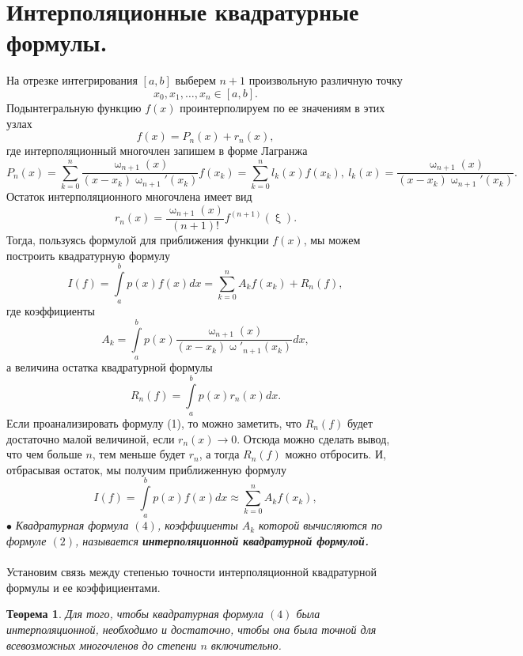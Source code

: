 \documentclass[a4paper, 12pt]{report}
\numberwithin{equation}{section}
\renewcommand{\omega}{\upomega}
\renewcommand{\xi}{\upxi}
\newtheorem*{theorem}{Теорема}
\begin{document}
	 \section{Интерполяционные квадратурные формулы.}
	 На отрезке интегрирования $[a,b]$ выберем $n+1$ произвольную различную точку $$x_0,x_1,\ldots, x_n \in [a,b].$$ Подынтегральную функцию $f(x)$ проинтерполируем по ее значениям в этих узлах $$f(x) = P_n(x) + r_n(x),$$ где интерполяционный многочлен запишем в форме Лагранжа $$P_n(x)=\sum_{k=0}^{n}\dfrac{\omega_{n+1}(x)}{(x-x_k)\omega_{n+1}'(x_k)}f(x_k) = \sum_{k=0}^{n} l_k(x) f(x_k),\ l_k(x) = \dfrac{\omega_{n+1}(x)}{(x-x_k)\omega_{n+1}'(x_k)}.$$  
	 Остаток интерполяционного многочлена имеет вид $$r_n(x) = \dfrac{\omega_{n+1}(x)}{(n+1)!}f^{(n+1)}(\xi).$$
	 Тогда, пользуясь формулой для приближения функции $f(x)$, мы можем построить квадратурную формулу \begin{equation}
	 	I(f) = \int\limits_a^b p(x)f(x)dx = \sum_{k=0}^{n}A_kf(x_k) + R_n(f),
	 \end{equation}
	 где коэффициенты 
	 \begin{equation}
	 	A_k = \int\limits_a^b p(x) \dfrac{\omega_{n+1}(x)}{(x-x_k)\omega'_{n+1}(x_k)}dx,
	 \end{equation}
	 а величина остатка квадратурной формулы 
	 \begin{equation}
	 	R_n(f) = \int\limits_a^b p(x)r_n(x)dx.
	 \end{equation}
	 Если проанализировать формулу (1), то можно заметить, что $R_n(f)$ будет достаточно малой величиной, если $r_n(x) \to 0$. Отсюда можно сделать вывод, что чем больше $n$, тем меньше будет $r_n$, а тогда $R_n(f)$ можно отбросить. И, отбрасывая остаток, мы получим приближенную формулу 
	 \begin{equation}
	 	I(f) = \int\limits_a^b p(x)f(x)dx \approx \sum_{k=0}^{n}A_kf(x_k),
	 \end{equation}
	 $\bullet$ \textit{Квадратурная формула $(4)$, коэффициенты $A_k$ которой вычисляются по формуле $(2)$, называется \textbf{интерполяционной квадратурной формулой.}}\\\\
	 Установим связь между степенью точности интерполяционной квадратурной формулы и ее коэффициентами.
	 \begin{theorem}
	 	Для того, чтобы квадратурная формула $(4)$ была интерполяционной, необходимо и достаточно, чтобы она была точной для всевозможных многочленов до степени $n$ включительно.
	 \end{theorem}
\end{document}
